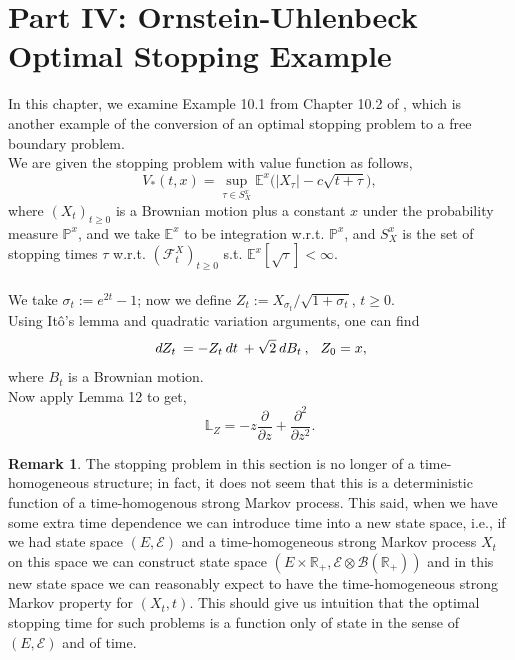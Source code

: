 \documentclass[12pt]{article}
\newcommand{\cB}{\mathcal{B}}
\newcommand{\cF}{\mathcal{F}}
\newcommand{\cE}{\mathcal{E}}
\newcommand{\E}{\mathbb{E}}
\newcommand{\R}{\mathbb{R}}
\newcommand{\bL}{\mathbb{L}}
\newcommand{\Prb}{\mathbb{P}}
\newcommand{\df}[1]{\hspace{2 px} d #1 \hspace{2 px}}
\newcommand{\spc}{\hspace{7 px}}
\theoremstyle{definition}
\newtheorem{remark}{Remark}
\begin{document}
\section*{Part IV: Ornstein-Uhlenbeck Optimal Stopping Example}\label{sec:part4}
In this chapter, we examine Example 10.1 from Chapter 10.2 of \cite{peskir2006}, which is another example of the conversion of an optimal stopping problem to a free boundary problem. \\
We are given the stopping problem with value function as follows,
\[
    V_*(t, x) = \sup_{\tau \in S^x_X} \E^x \Big (
        |X_\tau| - c \sqrt{t + \tau}
    \Big ),
\]
where $(X_t)_{t \geq 0}$ is a Brownian motion plus a constant $x$ under the probability measure $\Prb^x$, and we take $\E^x$ to be integration w.r.t. $\Prb^x$, and $S^x_X$ is the set of stopping times $\tau$ w.r.t. $(\cF^X_t)_{t \geq 0}$ s.t. $\E^x [\sqrt{\tau}] < \infty$. \\
\\
We take $\sigma_t := e^{2t} - 1$; now we define $Z_t := X_{\sigma_t} / \sqrt{1 + \sigma_t}$, $t \geq 0$. \\
Using Itô's lemma and quadratic variation arguments, one can find
\[
    \df{Z_t} = - Z_t \df{t} + \sqrt{2} \df{B_t}, \spc Z_0 = x,
\]
where $B_t$ is a Brownian motion. \\
Now apply Lemma 12 to get,
\[
    \bL_Z = -z \frac{\partial}{\partial z} + \frac{\partial^2}{\partial z^2}.
\]
\begin{remark}
    The stopping problem in this section is no longer of a time-homogeneous structure;
    in fact, it does not seem that this is a deterministic function of a time-homogenous strong Markov process.
    This said, when we have some extra time dependence we can introduce time into a new state space, i.e., if we had state space $(E, \cE)$ and a time-homogeneous strong Markov process $X_t$ on this space we can construct state space $(E \times \R_+, \cE \otimes \cB(\R_+))$ and in this new state space we can reasonably expect to have the time-homogeneous strong Markov property for $(X_t, t)$.
    This should give us intuition that the optimal stopping time for such problems is a function only of state in the sense of $(E, \cE)$ and of time. \\
\end{remark}
\end{document}
